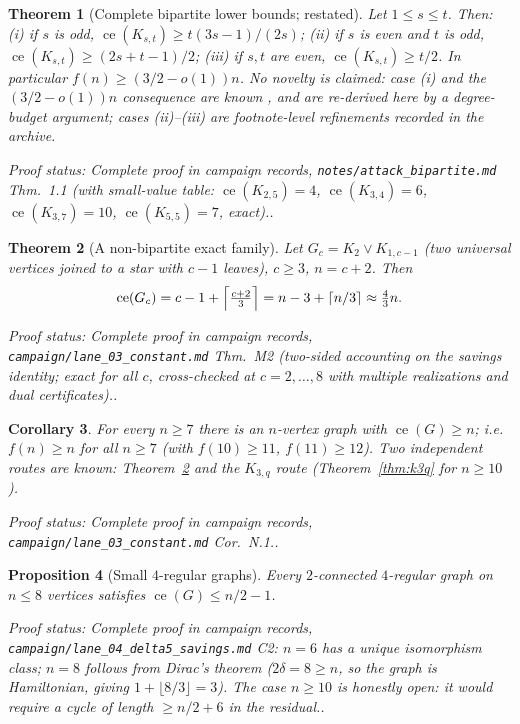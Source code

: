 \documentclass[a4paper,11pt]{amsart}
\newtheorem{theorem}{Theorem}[section]
\newtheorem{corollary}[theorem]{Corollary}
\newtheorem{proposition}[theorem]{Proposition}
\theoremstyle{definition}
\theoremstyle{remark}
\newcommand{\ce}{\operatorname{ce}}
\newcommand{\proofsrc}[1]{\par\smallskip\noindent\begin{sloppypar}\small\emph{Proof status: #1.}\end{sloppypar}\par\smallskip}
\begin{document}
\begin{theorem}[Complete bipartite lower bounds; restated]\label{thm:kst}
Let $1\le s\le t$. Then: (i) if $s$ is odd, $\ce(K_{s,t})\ge t(3s-1)/(2s)$; (ii) if $s$ is even and $t$ is
odd, $\ce(K_{s,t})\ge(2s+t-1)/2$; (iii) if $s,t$ are even, $\ce(K_{s,t})\ge t/2$. In particular
$f(n)\ge(3/2-o(1))n$. No novelty is claimed: case (i) and the $(3/2-o(1))n$ consequence are known
\cite{E83,BM22}, and are re-derived here by a degree-budget argument; cases (ii)--(iii) are footnote-level
refinements recorded in the archive.
\end{theorem}
\proofsrc{Complete proof in campaign records, \texttt{notes/attack\_bipartite.md} Thm.~1.1 (with small-value
table: $\ce(K_{2,5})=4$, $\ce(K_{3,4})=6$, $\ce(K_{3,7})=10$, $\ce(K_{5,5})=7$, exact).}

\begin{theorem}[A non-bipartite exact family]\label{thm:joinstar}
Let $G_c=K_2\vee K_{1,c-1}$ (two universal vertices joined to a star with $c-1$ leaves), $c\ge3$,
$n=c+2$. Then
\[
\ce(G_c)=c-1+\Bigl\lceil\tfrac{c+2}{3}\Bigr\rceil = n-3+\lceil n/3\rceil\approx\tfrac43 n .
\]
\end{theorem}
\proofsrc{Complete proof in campaign records, \texttt{campaign/lane\_03\_constant.md} Thm.~M2 (two-sided
accounting on the savings identity; exact for all $c$, cross-checked at $c=2,\dots,8$ with multiple
realizations and dual certificates).}

\begin{corollary}\label{cor:fn}
For every $n\ge7$ there is an $n$-vertex graph with $\ce(G)\ge n$; i.e.\ $f(n)\ge n$ for all $n\ge7$ (with
$f(10)\ge11$, $f(11)\ge12$). Two independent routes are known: Theorem~\ref{thm:joinstar} and the
$K_{3,q}$ route (Theorem~\ref{thm:k3q} for $n\ge10$).
\end{corollary}
\proofsrc{Complete proof in campaign records, \texttt{campaign/lane\_03\_constant.md} Cor.~N.1.}

\begin{proposition}[Small $4$-regular graphs]\label{prop:4reg}
Every $2$-connected $4$-regular graph on $n\le8$ vertices satisfies $\ce(G)\le n/2-1$.
\end{proposition}
\proofsrc{Complete proof in campaign records, \texttt{campaign/lane\_04\_delta5\_savings.md} C2: $n=6$ has
a unique isomorphism class; $n=8$ follows from Dirac's theorem ($2\delta=8\ge n$, so the graph is
Hamiltonian, giving $1+\lfloor 8/3\rfloor=3$). The case $n\ge10$ is honestly open: it would require a cycle
of length $\ge n/2+6$ in the residual.}
\end{document}
